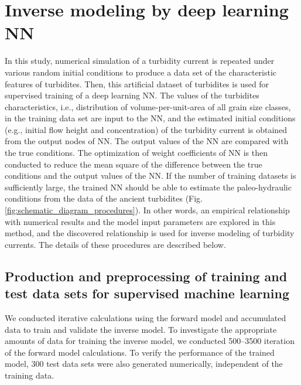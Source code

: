 
\section{Inverse modeling by deep learning NN}
In this study, numerical simulation of a turbidity current is repeated under various random initial conditions to produce a data set of the characteristic features of turbidites. Then, this artificial dataset of turbidites is used for supervised training of a deep learning NN. The values of the turbidites characteristics, i.e., distribution of volume-per-unit-area of all grain size classes, in the training data set are input to the NN, and the estimated initial conditions (e.g., initial flow height and concentration) of the turbidity current is obtained from the output nodes of NN. The output values of the NN are compared with the true conditions. The optimization of weight coefficients of NN is then conducted to reduce the mean square of the difference between the true conditions and the output values of the NN. If the number of training datasets is sufficiently large, the trained NN should be able to estimate the paleo-hydraulic conditions from the data of the ancient turbidites (Fig. \ref{fig:schematic_diagram_procedures}). In other words, an empirical relationship with numerical results and the model input parameters are explored in this method, and the discovered relationship is used for inverse modeling of turbidity currents. The details of these procedures are described below.

\subsection{Production and preprocessing of training and test data sets for supervised machine learning}

We conducted iterative calculations using the forward model and accumulated data to train and validate the inverse model. To investigate the appropriate amounts of data for training the inverse model, we conducted 500--3500 iteration of the forward model calculations. To verify the performance of the trained model, 300 test data sets were also generated numerically, independent of the training data.

